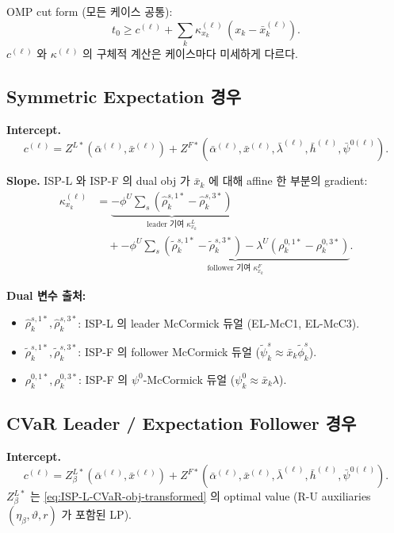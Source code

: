 \documentclass[11pt]{article}
\newcommand{\tilphi}{\tilde{\phi}}
\newcommand{\tilpsi}{\tilde{\psi}}
\theoremstyle{plain}
\theoremstyle{remark}
\begin{document}
OMP cut form (모든 케이스 공통):
\begin{equation}\label{eq:benders-cut}
\boxed{\;
t_0 \geq c^{(\ell)} + \textstyle\sum_k \kappa_{x_k}^{(\ell)}\,(x_k - \bar x_k^{(\ell)}).
\;}
\end{equation}
$c^{(\ell)}$ 와 $\kappa^{(\ell)}$ 의 구체적 계산은 케이스마다 미세하게 다르다.

\subsection{Symmetric Expectation 경우}

\textbf{Intercept.}
\[
c^{(\ell)} = Z^{L*}(\bar\alpha^{(\ell)}, \bar x^{(\ell)}) + Z^{F*}(\bar\alpha^{(\ell)}, \bar x^{(\ell)}, \bar\lambda^{(\ell)}, \bar h^{(\ell)}, \bar\psi^{0(\ell)}).
\]

\textbf{Slope.} ISP-L 와 ISP-F 의 dual obj 가 $\bar x_k$ 에 대해 affine 한 부분의 gradient:
\begin{align*}
\kappa_{x_k}^{(\ell)} &= \underbrace{-\phi^U \textstyle\sum_s (\hat\rho_k^{s,1*} - \hat\rho_k^{s,3*})}_{\text{leader 기여 } \kappa^L_{x_k}}\\
&\quad + \underbrace{-\phi^U \textstyle\sum_s (\tilde\rho_k^{s,1*} - \tilde\rho_k^{s,3*}) - \lambda^U(\rho_k^{0,1*} - \rho_k^{0,3*})}_{\text{follower 기여 } \kappa^F_{x_k}}.
\end{align*}

\textbf{Dual 변수 출처:}
\begin{itemize}[leftmargin=*,nosep]
\item $\hat\rho_k^{s,1*}, \hat\rho_k^{s,3*}$: ISP-L 의 leader McCormick 듀얼 (EL-McC1, EL-McC3).
\item $\tilde\rho_k^{s,1*}, \tilde\rho_k^{s,3*}$: ISP-F 의 follower McCormick 듀얼 ($\tilpsi_k^s \approx \bar x_k \tilphi_k^s$).
\item $\rho_k^{0,1*}, \rho_k^{0,3*}$: ISP-F 의 $\psi^0$-McCormick 듀얼 ($\psi^0_k \approx \bar x_k \lambda$).
\end{itemize}

\subsection{CVaR Leader / Expectation Follower 경우}

\textbf{Intercept.}
\[
c^{(\ell)} = Z^{L*}_\beta(\bar\alpha^{(\ell)}, \bar x^{(\ell)}) + Z^{F*}(\bar\alpha^{(\ell)}, \bar x^{(\ell)}, \bar\lambda^{(\ell)}, \bar h^{(\ell)}, \bar\psi^{0(\ell)}).
\]
$Z^{L*}_\beta$ 는 \eqref{eq:ISP-L-CVaR-obj-transformed} 의 optimal value (R-U auxiliaries $(\eta_\beta, \vartheta, r)$ 가 포함된 LP).
\end{document}
